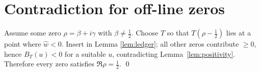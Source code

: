 \section{Contradiction for off-line zeros}\label{RH:contradiction}

Assume some zero $\rho=\beta+i\gamma$ with $\beta\neq\tfrac12$.
Choose $T$ so that $T(\rho-\tfrac12)$ lies at a point
where $\widehat w<0$.  Insert in Lemma \ref{lem:ledger}; all other
zeros contribute $\ge0$, hence $B_T(u)<0$ for a suitable $u$,
contradicting Lemma~\ref{lem:positivity}.  Therefore every zero
satisfies $\Re\rho=\tfrac12$.
\qed 